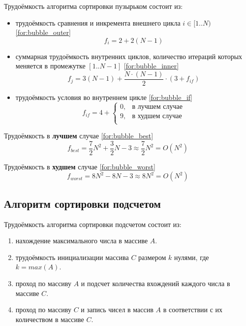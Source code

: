 Трудоёмкость алгоритма сортировки пузырьком состоит из:
\begin{itemize}
    \item трудоёмкость сравнения и инкремента внешнего цикла $i \in [1..N)$ \eqref{for:bubble_outer}
    \begin{equation}
        \label{for:bubble_outer}
        f_{i} = 2 + 2(N - 1)
    \end{equation}
    \item суммарная трудоёмкость внутренних циклов, количество итераций которых меняется в промежутке $[1..N-1]$ \eqref{for:bubble_inner}
    \begin{equation}
        \label{for:bubble_inner}
        f_{j} = 3(N - 1) + \frac{N \cdot (N - 1)}{2} \cdot (3 + f_{if})
    \end{equation}
    \item трудоёмкость условия во внутреннем цикле \eqref{for:bubble_if}
    \begin{equation}
        \label{for:bubble_if}
        f_{if} = 4 + \begin{cases}
                         0, & \text{в лучшем случае}\\
                         9, & \text{в худшем случае}\\
        \end{cases}
    \end{equation}
\end{itemize}

Трудоёмкость в \textbf{лучшем} случае \eqref{for:bubble_best}
\begin{equation}
    \label{for:bubble_best}
    f_{best} = \frac{7}{2} N^2 + \frac{3}{2} N - 3 \approx \frac{7}{2} N^2 = O(N^2)
\end{equation}

Трудоёмкость в \textbf{худшем} случае \eqref{for:bubble_worst}
\begin{equation}
    \label{for:bubble_worst}
    f_{worst} =  8N^2 - 8N - 3 \approx 8N^2 = O(N^2)
\end{equation}

\subsection{Алгоритм сортировки подсчетом}

Трудоёмкость алгоритма сортировки подсчетом состоит из:
\begin{enumerate}
    \item нахождение максимального числа в массиве $A$.
    \item трудоёмкость инициализации массива $C$ размером $k$ нулями, где $k = max(A)$.
    \item проход по массиву $A$ и подсчет количества вхождений каждого числа в массиве $C$.
    \item проход по массиву $C$ и запись чисел в массив $A$ в соответствии с их количеством в массиве $C$.
\end{enumerate}

